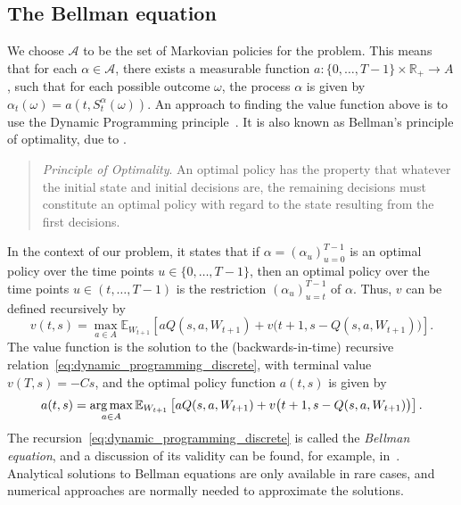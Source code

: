 \documentclass[main.tex]{subfiles}
\begin{document}
\subsection{The Bellman equation}\label{subsec:adp_bellman_equation}
We choose $\mathcal{A}$ to be the set of Markovian policies for the
problem. This means that for each $\alpha\in \mathcal{A}$, there exists a
measurable function $a:\{0,\dots,T-1\}\times \mathbb{R}_+\to A$, such
that for each possible outcome
$\omega$, the process $\alpha$ is given by
$\alpha_{t}(\omega) = a(t,S_t^\alpha(\omega))$.
An approach to finding the value function above is to use the Dynamic
Programming principle~\citep{bertsekas2005dynamic}. It is also known
as Bellman's principle of optimality, due to \citet{bellman1954theory}.
\begin{quote}
  \emph{Principle of Optimality}. An optimal policy has the property that
  whatever the initial state and initial decisions are, the remaining decisions
  must constitute an optimal policy with regard to the state resulting
  from the first decisions.
\end{quote}
In the context of our problem, it states that
if $\alpha = {(\alpha_u)}_{u=0}^{T-1}$ is an optimal policy over the time
points $u\in\{0,\dots,T-1\}$, then an optimal policy
over the time points $u\in(t,\dots,T-1)$ is the restriction
${(\alpha_u)}_{u=t}^{T-1}$ of $\alpha$.
Thus, $v$ can be defined recursively by
\begin{equation}\label{eq:dynamic_programming_discrete}
  v(t,s)=\max_{a\in A}\mathbb{E}_{W_{t+1}}\left[
    aQ(s,a,W_{t+1})
    +v\bigl(t+1,s-Q(s,a,W_{t+1})\bigr)\right].
\end{equation}
The value function is the solution to the (backwards-in-time)
recursive relation~\eqref{eq:dynamic_programming_discrete}, with
terminal value $v(T,s)=-Cs$, and the optimal policy
function $a(t,s)$ is given by
\begin{equation}
  a(t,s) =\operatorname*{arg\,max}_{a\in A}\mathbb{E}_{W_{t+1}}\left[
    aQ(s,a,W_{t+1})
    +v\bigl(t+1,s-Q(s,a,W_{t+1})\bigr)\right].
\end{equation}
The recursion~\eqref{eq:dynamic_programming_discrete} is called the
\emph{Bellman equation}, and a discussion
of its validity can be found, for example, in~\citet{bertsekas2005dynamic}.
Analytical solutions to Bellman equations are only available in
rare cases, and  numerical approaches are normally needed to
approximate the solutions.
\end{document}
